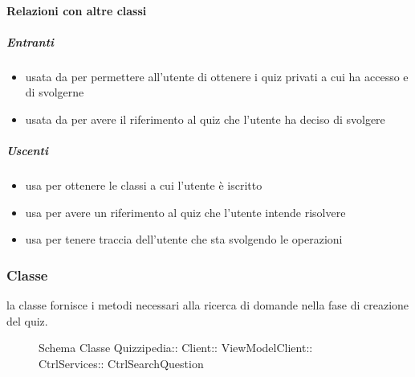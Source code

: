 \paragraph{Relazioni con altre classi}
\subparagraph{Entranti}
\begin{itemize}
\item usata da  per permettere all'utente di ottenere i quiz privati a cui ha accesso e di svolgerne
\item usata da  per avere il riferimento al quiz che l'utente ha deciso di svolgere
\end{itemize}
\subparagraph{Uscenti}
\begin{itemize}
\item usa  per ottenere le classi a cui l'utente è iscritto
\item usa  per avere un riferimento al quiz che l'utente intende risolvere
\item usa  per tenere traccia dell'utente che sta svolgendo le operazioni
\end{itemize}
\subsubsection{Classe }
la classe fornisce i metodi necessari alla ricerca di domande nella fase di creazione del quiz.
\begin{figure}[H]
\centering
\noindent{}
\caption[Schema Classe CtrlSearchQuestion]{Schema Classe Quizzipedia:: Client:: ViewModelClient:: CtrlServices:: CtrlSearchQuestion}
\end{figure}
